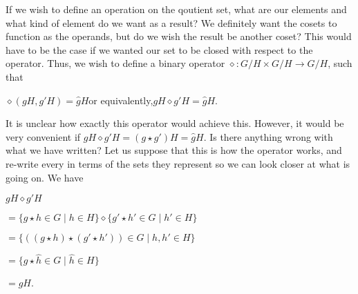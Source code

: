 \documentclass[12pt, a4paper]{article}
\begin{document}
\vspace{4mm}

    If we wish to define an operation on the qoutient set, what are our elements and what kind of element do we want as a result? We definitely want the cosets to function as the operands, but do we wish the result be another coset? This would have to be the case if we wanted our set to be closed with respect to the operator. Thus, we wish to define a binary operator $\diamond\colon G/H\times G/H\rightarrow G/H$, such that\par
    
\vspace{4mm}

        \centerline{$\diamond(gH,g'H)=\hat{g}H$\hspace{3mm}or equivalently,\hspace{3mm}$gH\diamond g'H=\hat{g}H$.}
        
\vspace{4mm}

    It is unclear how exactly this operator would achieve this. However, it would be very convenient if $gH\diamond g'H=(g\star g')H=\hat{g}H$. Is there anything wrong with what we have written? Let us suppose that this is how the operator works, and re-write every in terms of the sets they represent so we can look closer at what is going on. We have\par
    
\vspace{4mm}

        \centerline{$gH\diamond g'H$}
        
\vspace{2mm}

        \centerline{$=\{g\star h\in G\mid h\in H\}\diamond\{g'\star h'\in G\mid h'\in H\}$}
        
\vspace{2mm}

        \centerline{$=\{((g\star h)\star(g'\star h'))\in G\mid h,h'\in H\}$}
        
\vspace{2mm}

        \centerline{$=\{\hat{g}\star\hat{h}\in G\mid\hat{h}\in H\}$}
        
\vspace{2mm}

        \centerline{$=\hat{g}H$.}
        
\vspace{4mm}
\end{document}

